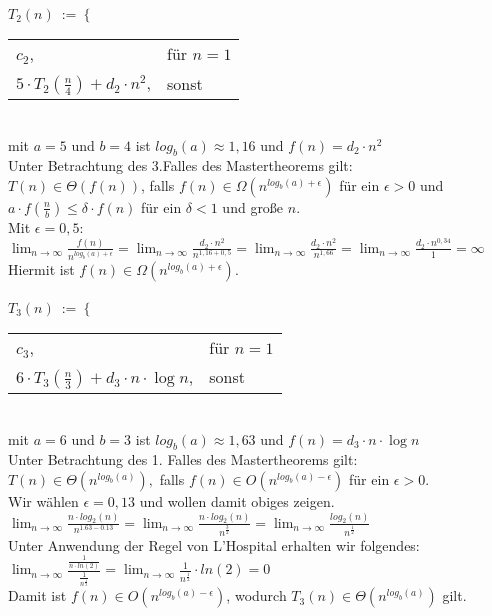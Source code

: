 $T_2(n)\ :=\ \bigg\{$
\begin{tabular}{ll}
$c_2$,&für $n = 1$\\
$5 \cdot T_2(\frac{n}{4}) + d_2 \cdot n^2$,&sonst
\end{tabular}\\
mit $a=5$ und $b=4$ ist $log_b(a) \approx 1,16$ und $f(n) = d_2 \cdot n^2$\\
Unter Betrachtung des 3.Falles des Mastertheorems gilt:\\
$T(n) \in \Theta(f(n))$, falls $f(n)\in \Omega(n^{log_b(a)+\epsilon})$ für ein $\epsilon > 0$ und $a \cdot f(\frac{n}{b})\leq \delta \cdot f(n)$ für ein $\delta < 1$ und große $n$.\\
Mit $\epsilon = 0,5$:\\
$\lim_{n\to\infty}\frac{f(n)}{n^{log_b(a)+\epsilon}} = \lim_{n\to\infty}\frac{d_2\cdot n^2}{n^{1,16 + 0,5}} = \lim_{n\to\infty}\frac{d_2\cdot n^2}{n^{1,66}} = \lim_{n\to\infty}\frac{d_2\cdot n^{0,34}}{1} = \infty$\\
Hiermit ist $f(n) \in \Omega(n^{log_b(a) + \epsilon})$.\\\\
$T_3(n)\ :=\ \bigg\{$
\begin{tabular}{ll}
$c_3$,&für $n = 1$\\
$6 \cdot T_3(\frac{n}{3}) + d_3 \cdot n \cdot \log n$,&sonst
\end{tabular}\\
mit $a = 6$ und $b = 3$ ist $log_b(a) \approx 1,63$ und $f(n) = d_3 \cdot n \cdot \log n$\\
Unter Betrachtung des 1. Falles des Mastertheorems gilt:\\
$T(n) \in  \Theta(n^{log_b(a)}),$ falls $f(n) \in O(n^{log_b(a) - \epsilon})$ für ein $\epsilon > 0$.\\
Wir wählen $\epsilon = 0,13$ und wollen damit obiges zeigen.\\
$\lim_{n \to \infty} \frac{n \cdot log_2(n)}{n^{1.63 - 0.13}} = \lim_{n \to \infty} \frac{n \cdot log_2(n)}{n^{\frac{3}{2}}} = \lim_{n \to \infty} \frac{log_2(n)}{n^{\frac{1}{2}}}$\\
Unter Anwendung der Regel von L'Hospital erhalten wir folgendes:\\
$\lim_{n \to \infty} \frac{\frac{1}{n \cdot ln(2)}}{\frac{1}{n^{\frac{1}{2}}}} = \lim_{n \to \infty} \frac{1}{n^{\frac{1}{2}}}\cdot ln(2) = 0$\\
Damit ist $f(n) \in O(n^{log_b(a) - \epsilon})$, wodurch $T_3(n) \in \Theta(n^{log_b(a)})$ gilt.

